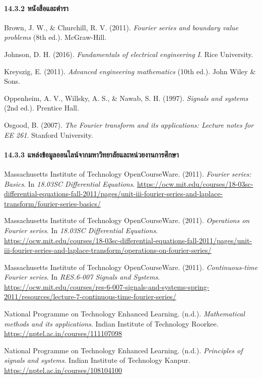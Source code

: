 \paragraph{14.3.2 หนังสือและตำรา}

Brown, J. W., \& Churchill, R. V. (2011). \textit{Fourier series and boundary value problems} (8th ed.). McGraw-Hill.

Johnson, D. H. (2016). \textit{Fundamentals of electrical engineering I}. Rice University.

Kreyszig, E. (2011). \textit{Advanced engineering mathematics} (10th ed.). John Wiley \& Sons.

Oppenheim, A. V., Willsky, A. S., \& Nawab, S. H. (1997). \textit{Signals and systems} (2nd ed.). Prentice Hall.

Osgood, B. (2007). \textit{The Fourier transform and its applications: Lecture notes for EE 261}. Stanford University.

\paragraph{14.3.3 แหล่งข้อมูลออนไลน์จากมหาวิทยาลัยและหน่วยงานการศึกษา}

\begingroup
\raggedright

Massachusetts Institute of Technology OpenCourseWare. (2011). \textit{Fourier series: Basics}. In \textit{18.03SC Differential Equations}. \url{https://ocw.mit.edu/courses/18-03sc-differential-equations-fall-2011/pages/unit-iii-fourier-series-and-laplace-transform/fourier-series-basics/}

Massachusetts Institute of Technology OpenCourseWare. (2011). \textit{Operations on Fourier series}. In \textit{18.03SC Differential Equations}. \url{https://ocw.mit.edu/courses/18-03sc-differential-equations-fall-2011/pages/unit-iii-fourier-series-and-laplace-transform/operations-on-fourier-series/}

Massachusetts Institute of Technology OpenCourseWare. (2011). \textit{Continuous-time Fourier series}. In \textit{RES.6-007 Signals and Systems}. \url{https://ocw.mit.edu/courses/res-6-007-signals-and-systems-spring-2011/resources/lecture-7-continuous-time-fourier-series/}

National Programme on Technology Enhanced Learning. (n.d.). \textit{Mathematical methods and its applications}. Indian Institute of Technology Roorkee. \url{https://nptel.ac.in/courses/111107098}

National Programme on Technology Enhanced Learning. (n.d.). \textit{Principles of signals and systems}. Indian Institute of Technology Kanpur. \url{https://nptel.ac.in/courses/108104100}

